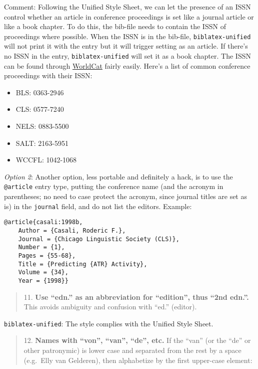 \documentclass[
]{article}
\providecommand{\tightlist}{%
  \setlength{\itemsep}{0pt}\setlength{\parskip}{0pt}}
\begin{document}
Comment: Following the Unified Style Sheet, we can let the presence of
an ISSN control whether an article in conference proceedings is set like
a journal article or like a book chapter. To do this, the bib-file needs
to contain the ISSN of proceedings where possible. When the ISSN is in
the bib-file, \texttt{biblatex-unified} will not print it with the entry
but it will trigger setting as an article. If there's no ISSN in the
entry, \texttt{biblatex-unified} will set it as a book chapter. The ISSN
can be found through \href{http://www.worldcat.org}{WorldCat} fairly
easily. Here's a list of common conference proceedings with their ISSN:

\begin{itemize}
\tightlist
\item
  BLS: 0363-2946
\item
  CLS: 0577-7240
\item
  NELS: 0883-5500
\item
  SALT: 2163-5951
\item
  WCCFL: 1042-1068
\end{itemize}

\emph{Option 2}: Another option, less portable and definitely a hack, is
to use the \texttt{@article} entry type, putting the conference name
(and the acronym in parentheses; no need to case protect the acronym,
since journal titles are set as is) in the \texttt{journal} field, and
do not list the editors. Example:

\begin{verbatim}
@article{casali:1998b,
    Author = {Casali, Roderic F.},
    Journal = {Chicago Linguistic Society (CLS)},
    Number = {1},
    Pages = {55-68},
    Title = {Predicting {ATR} Activity},
    Volume = {34},
    Year = {1998}}
\end{verbatim}

\begin{quote}
11. \textbf{Use ``edn.'' as an abbreviation for ``edition'', thus ``2nd
edn.''.} This avoids ambiguity and confusion with ``ed.'' (editor).
\end{quote}

\texttt{biblatex-unified}: The style complies with the Unified Style
Sheet.

\begin{quote}
12. \textbf{Names with ``von'', ``van'', ``de'', etc.} If the ``van''
(or the ``de'' or other patronymic) is lower case and separated from the
rest by a space (e.g.~Elly van Gelderen), then alphabetize by the first
upper-case element:
\end{quote}
\end{document}
